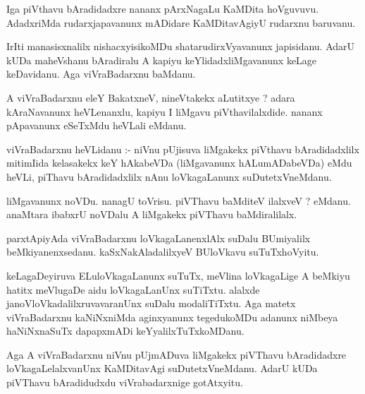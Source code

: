 \documentclass{article}
\begin{document}
\begin{mn}
Iga  piVthavu  bAradidadxre  nananx  pArxNagaLu  KaMDita  hoVguvuvu.  AdadxriMda  rudarxjapavanunx  
mADidare  KaMDitavAgiyU  rudarxnu  baruvanu.
\end{mn}

\begin{mn}
IrIti  manasisxnalilx  nishacxyisikoMDu  shatarudirxVyavanunx  japisidanu.  AdarU  kUDa  maheVshanu  
bAradiralu  A  kapiyu  keYlidadxliMgavanunx  keLage  keDavidanu.  Aga  viVraBadarxnu  baMdanu.
\end{mn}

\begin{mn}
A  viVraBadarxnu  eleY  BakatxneV,  nineVtakekx  aLutitxye ?  adara  kAraNavanunx  heVLenanxlu,  
kapiyu  I  liMgavu  piVthavilalxdide.  nananx  pApavanunx  eSeTxMdu  heVLali  eMdanu.
\end{mn}

\begin{mn}
viVraBadarxnu  heVLidanu :- niVnu  pUjisuva  liMgakekx  piVthavu  bAradidadxlilx  mitimIida  kelasakekx  keY 
hAkabeVDa (liMgavanunx  hALumADabeVDa) eMdu  heVLi,  piThavu  bAradidadxlilx  nAnu  loVkagaLanunx  suDutetxVneMdanu.
\end{mn}

\begin{mn}
liMgavanunx  noVDu.  nanagU  toVrisu.  piVThavu  baMditeV  ilalxveV ?  eMdanu.  anaMtara  ibabxrU  
noVDalu  A  liMgakekx  piVThavu  baMdiralilalx.
\end{mn}

\begin{mn}
parxtApiyAda  viVraBadarxnu  loVkagaLanenxlAlx  suDalu  BUmiyalilx  beMkiyanenxsedanu.  
kaSxNakAladalilxyeV  BUloVkavu  suTuTxhoVyitu.
\end{mn}

\begin{mn}
keLagaDeyiruva  ELuloVkagaLanunx  suTuTx,  meVlina  loVkagaLige  A  beMkiyu  hatitx  meVlugaDe  aidu  
loVkagaLanUnx  suTiTxtu.  alalxde  janoVloVkadalilxruvavaranUnx  suDalu  modaliTiTxtu.  Aga  matetx  
viVraBadarxnu  kaNiNxniMda  aginxyanunx  tegedukoMDu  adanunx  niMbeya  haNiNxnaSuTx  dapapxmADi  keYyalilxTuTxkoMDanu.
\end{mn}

\begin{mn}
Aga  A  viVraBadarxnu  niVnu  pUjmADuva  liMgakekx  piVThavu  bAradidadxre  loVkagaLelalxvanUnx  
KaMDitavAgi  suDutetxVneMdanu.  AdarU  kUDa  piVThavu  bAradidudxdu  viVrabadarxnige  gotAtxyitu.
\end{mn}
\end{document}
